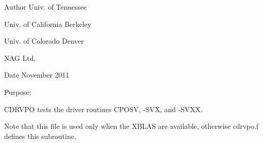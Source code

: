 \begin{DoxyAuthor}{Author}
Univ. of Tennessee 

Univ. of California Berkeley 

Univ. of Colorado Denver 

N\+A\+G Ltd. 
\end{DoxyAuthor}
\begin{DoxyDate}{Date}
November 2011
\end{DoxyDate}
\begin{DoxyParagraph}{Purpose\+: }
\begin{DoxyVerb} CDRVPO tests the driver routines CPOSV, -SVX, and -SVXX.

 Note that this file is used only when the XBLAS are available,
 otherwise cdrvpo.f defines this subroutine.\end{DoxyVerb}
 
\end{DoxyParagraph}

